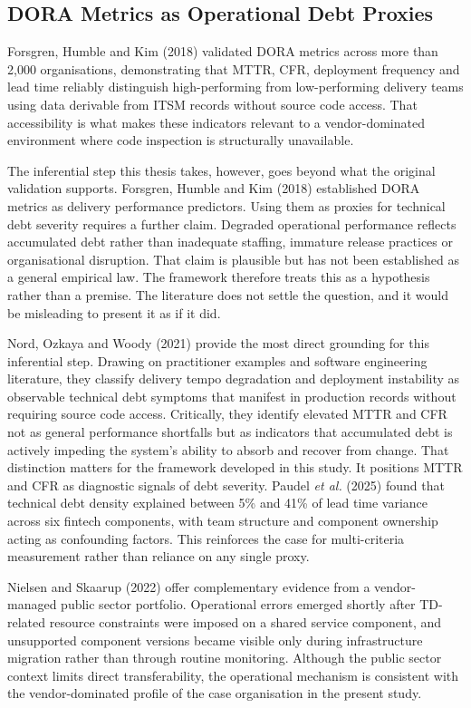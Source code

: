 \documentclass[
  12pt,
  letterpaper,
  12pt,
  oneside,
  english,
  onehalfspacing,
  headsepline]{MastersDoctoralThesis}
\begin{document}
\subsection{DORA Metrics as Operational Debt
Proxies}\label{dora-metrics-as-operational-debt-proxies}

Forsgren, Humble and Kim (2018) validated DORA metrics across more than
2,000 organisations, demonstrating that MTTR, CFR, deployment frequency
and lead time reliably distinguish high-performing from low-performing
delivery teams using data derivable from ITSM records without source
code access. That accessibility is what makes these indicators relevant
to a vendor-dominated environment where code inspection is structurally
unavailable.

The inferential step this thesis takes, however, goes beyond what the
original validation supports. Forsgren, Humble and Kim (2018)
established DORA metrics as delivery performance predictors. Using them
as proxies for technical debt severity requires a further claim.
Degraded operational performance reflects accumulated debt rather than
inadequate staffing, immature release practices or organisational
disruption. That claim is plausible but has not been established as a
general empirical law. The framework therefore treats this as a
hypothesis rather than a premise. The literature does not settle the
question, and it would be misleading to present it as if it did.

Nord, Ozkaya and Woody (2021) provide the most direct grounding for this
inferential step. Drawing on practitioner examples and software
engineering literature, they classify delivery tempo degradation and
deployment instability as observable technical debt symptoms that
manifest in production records without requiring source code access.
Critically, they identify elevated MTTR and CFR not as general
performance shortfalls but as indicators that accumulated debt is
actively impeding the system's ability to absorb and recover from
change. That distinction matters for the framework developed in this
study. It positions MTTR and CFR as diagnostic signals of debt severity.
Paudel \emph{et al.} (2025) found that technical debt density explained
between 5\% and 41\% of lead time variance across six fintech
components, with team structure and component ownership acting as
confounding factors. This reinforces the case for multi-criteria
measurement rather than reliance on any single proxy.

Nielsen and Skaarup (2022) offer complementary evidence from a
vendor-managed public sector portfolio. Operational errors emerged
shortly after TD-related resource constraints were imposed on a shared
service component, and unsupported component versions became visible
only during infrastructure migration rather than through routine
monitoring. Although the public sector context limits direct
transferability, the operational mechanism is consistent with the
vendor-dominated profile of the case organisation in the present study.
\end{document}

